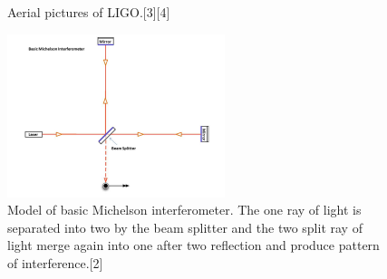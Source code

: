 \documentclass[journal,comsoc,twoside]{IEEEtran}
\begin{document}
\begin{figure}[!t]
\centering
{}
\hfil
{}
\caption{Aerial pictures of LIGO.[3][4]}
\label{LIGO}
\end{figure}

\begin{figure}[!t]
\centering
\includegraphics[width=2.5in]{interferometer.png}
\caption{Model of basic Michelson interferometer. The one ray of light is separated into two by the beam splitter and the two split ray of light merge again into one after two reflection and produce pattern of interference.[2]}
\label{interferometer}
\end{figure}
\end{document}
